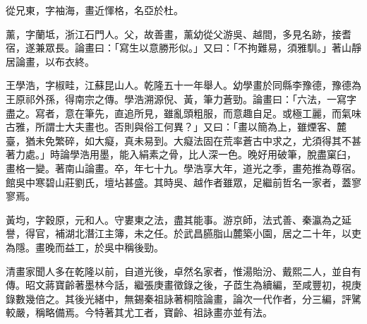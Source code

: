 \begin{pinyinscope}
從兄東，字袖海，畫近惲格，名亞於杜。

薰，字蘭坻，浙江石門人。父，故善畫，薰幼從父游吳、越間，多見名跡，接耆宿，遂兼眾長。論畫曰：「寫生以意勝形似。」又曰：「不拘難易，須雅馴。」著山靜居論畫，以布衣終。

王學浩，字椒畦，江蘇昆山人。乾隆五十一年舉人。幼學畫於同縣李豫德，豫德為王原祁外孫，得南宗之傳。學浩溯源倪、黃，筆力蒼勁。論畫曰：「六法，一寫字盡之。寫者，意在筆先，直追所見，雖亂頭粗服，而意趣自足。或極工麗，而氣味古雅，所謂士大夫畫也。否則與俗工何異？」又曰：「畫以簡為上，雖煙客、麓臺，猶未免繁碎，如大癡，真未易到。大癡法固在荒率蒼古中求之，尤須得其不甚著力處。」時論學浩用墨，能入絹素之骨，比人深一色。晚好用破筆，脫盡窠臼，畫格一變。著南山論畫。卒，年七十九。學浩享大年，道光之季，畫苑推為尊宿。館吳中寒碧山莊劉氏，壇坫甚盛。其時吳、越作者雖眾，足繼前哲名一家者，蓋寥寥焉。

黃均，字穀原，元和人。守婁東之法，盡其能事。游京師，法式善、秦瀛為之延譽，得官，補湖北潛江主簿，未之任。於武昌臙脂山麓築小園，居之二十年，以吏為隱。畫晚而益工，於吳中稱後勁。

清畫家聞人多在乾隆以前，自道光後，卓然名家者，惟湯貽汾、戴熙二人，並自有傳。昭文蔣寶齡著墨林今話，繼張庚畫徵錄之後，子茝生為續編，至咸豐初，視庚錄數幾倍之。其後光緒中，無錫秦祖詠著桐陰論畫，論次一代作者，分三編，評騭較嚴，稱略備焉。今特著其尤工者，寶齡、祖詠畫亦並有法。


\end{pinyinscope}
